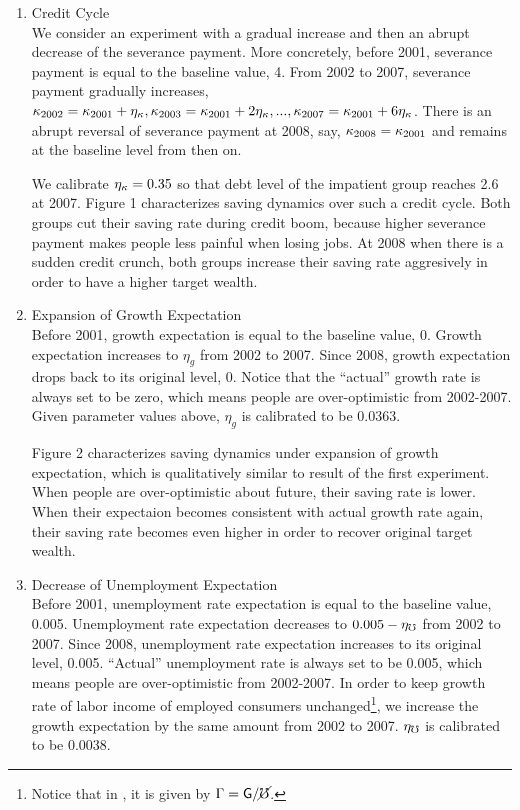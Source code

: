 \documentclass[titlepage,abstract,letterpaper]{econtex}
\begin{document}
\begin{enumerate}
\item Credit Cycle\\
We consider an experiment with a gradual increase and then an abrupt decrease of the severance payment. More concretely, before 2001, severance payment is equal to the baseline value, 4. From 2002 to 2007, severance payment gradually increases, $\kappa_{2002}=\kappa_{2001}+\eta_{\kappa},\kappa_{2003}=\kappa_{2001}+2\eta_{\kappa},...,\kappa_{2007}=\kappa_{2001}+6\eta_{\kappa}$. There is an abrupt reversal of severance payment at 2008, say, $\kappa_{2008}=\kappa_{2001}$ and remains at the baseline level from then on. 

We calibrate $\eta_{\kappa}=0.35$ so that debt level of the impatient group reaches 2.6 at 2007.
Figure 1 characterizes saving dynamics over such a credit cycle. Both groups cut their saving rate during credit boom, because higher severance payment makes people less painful when losing jobs. At 2008 when there is a sudden credit crunch, both groups increase their saving rate aggresively in order to have a higher target wealth.

\item Expansion of Growth Expectation\\
Before 2001, growth expectation is equal to the baseline value, 0. Growth expectation increases to $\eta_g$ from 2002 to 2007. Since 2008, growth expectation drops back to its original level, 0. Notice that the ``actual'' growth rate is always set to be zero, which means people are over-optimistic from 2002-2007. Given parameter values above, $\eta_g$ is calibrated to be 0.0363. 

Figure 2 characterizes saving dynamics under expansion of growth expectation, which is qualitatively similar to result of the first experiment. When people are over-optimistic about future, their saving rate is lower. When their expectaion becomes consistent with actual growth rate again, their saving rate becomes even higher in order to recover original target wealth.

\item Decrease of Unemployment Expectation\\
Before 2001, unemployment rate expectation is equal to the baseline value, 0.005. Unemployment rate expectation decreases to $0.005-\eta_{\mho}$ from 2002 to 2007. Since 2008, unemployment rate expectation increases to its original level, 0.005.  ``Actual'' unemployment rate is always set to be 0.005, which means people are over-optimistic from 2002-2007. In order to keep growth rate of labor income of employed consumers unchanged\footnote{Notice that in \cite{ctDiscrete}, it is given by $\Gamma = \mathsf{G}/\cancel{\mho}$.}, we increase the growth expectation by the same amount from 2002 to 2007.  $\eta_{\mho}$ is calibrated to be 0.0038.


\end{enumerate}
\end{document}
